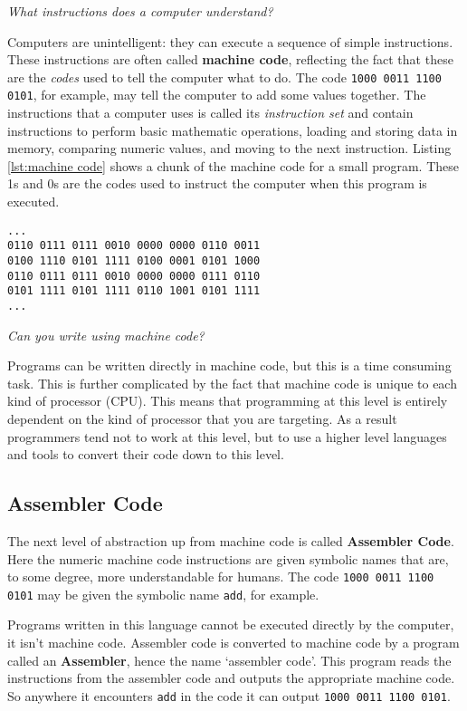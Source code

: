 \medskip

\emph{What instructions does a computer understand?}

Computers are unintelligent: they can execute a sequence of simple instructions. These instructions are often called \textbf{machine code}, reflecting the fact that these are the \emph{codes} used to tell the computer what to do. The code \texttt{1000 0011 1100 0101}, for example, may tell the computer to add some values together. The instructions that a computer uses is called its {\em instruction set} and contain instructions to perform basic mathematic operations, loading and storing data in memory, comparing numeric values, and moving to the next instruction. Listing \ref{lst:machine code} shows a chunk of the machine code for a small program. These 1s and 0s are the codes used to instruct the computer when this program is executed.

\begin{lstlisting}[caption={128 bits from the 106,752 bits of Machine Code from a small program.},label={lst:machine code}]
...
0110 0111 0111 0010 0000 0000 0110 0011
0100 1110 0101 1111 0100 0001 0101 1000
0110 0111 0111 0010 0000 0000 0111 0110
0101 1111 0101 1111 0110 1001 0101 1111
...
\end{lstlisting}

\emph{Can you write using machine code?}

Programs can be written directly in machine code, but this is a time consuming task. This is further complicated by the fact that machine code is unique to each kind of processor (CPU). This means that programming at this level is entirely dependent on the kind of processor that you are targeting. As a result programmers tend not to work at this level, but to use a higher level languages and tools to convert their code down to this level.

\subsection{Assembler Code} %
\label{sub:assembler_code}

The next level of abstraction up from machine code is called \textbf{Assembler Code}. Here the numeric machine code instructions are given symbolic names that are, to some degree, more understandable for humans. The code \texttt{1000 0011 1100 0101} may be given the symbolic name \texttt{add}, for example.

Programs written in this language cannot be executed directly by the computer, it isn't machine code. Assembler code is converted to machine code by a program called an \textbf{Assembler}, hence the name `assembler code'. This program reads the instructions from the assembler code and outputs the appropriate machine code. So anywhere it encounters \texttt{add} in the code it can output \texttt{1000 0011 1100 0101}.

